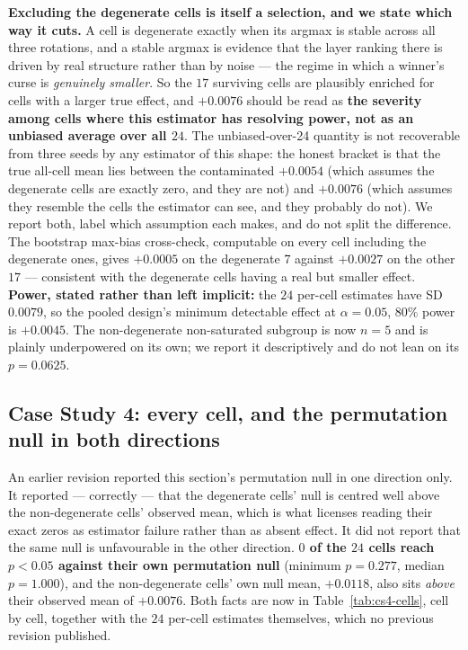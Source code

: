 \documentclass[10pt]{article} %
\begin{document}
\textbf{Excluding the degenerate cells is itself a selection, and we state
which way it cuts.} A cell is degenerate exactly when its argmax is stable
across all three rotations, and a stable argmax is evidence that the layer
ranking there is driven by real structure rather than by noise --- the regime
in which a winner's curse is \emph{genuinely smaller}. So the $17$ surviving
cells are plausibly enriched for cells with a larger true effect, and
$+0.0076$ should be read as \textbf{the severity among cells where this
estimator has resolving power, not as an unbiased average over all $24$}. The
unbiased-over-24 quantity is not recoverable from three seeds by any estimator
of this shape: the honest bracket is that the true all-cell mean lies between
the contaminated $+0.0054$ (which assumes the degenerate cells are exactly
zero, and they are not) and $+0.0076$ (which assumes they resemble the cells
the estimator can see, and they probably do not). We report both, label which
assumption each makes, and do not split the difference. The bootstrap max-bias
cross-check, computable on every cell including the degenerate ones, gives
$+0.0005$ on the degenerate $7$ against $+0.0027$ on the other $17$ ---
consistent with the degenerate cells having a real but smaller effect.
\textbf{Power, stated rather than left implicit:} the $24$ per-cell estimates
have SD $0.0079$, so the pooled design's minimum detectable effect at
$\alpha=0.05$, $80\%$ power is $+0.0045$. The non-degenerate non-saturated
subgroup is now $n=5$ and is plainly underpowered on its own; we report it
descriptively and do not lean on its $p=0.0625$.

\subsection{Case Study 4: every cell, and the permutation null in both directions}
\label{sec:cs4-percell}

An earlier revision reported this section's permutation null in one direction
only. It reported --- correctly --- that the degenerate cells' null is centred
well above the non-degenerate cells' observed mean, which is what licenses
reading their exact zeros as estimator failure rather than as absent effect. It
did not report that the same null is unfavourable in the other direction.
\textbf{$0$ of the $24$ cells reach $p<0.05$ against their own permutation
null} (minimum $p=0.277$, median $p=1.000$), and the non-degenerate cells' own
null mean, $+0.0118$, also sits \emph{above} their observed mean of $+0.0076$.
Both facts are now in Table~\ref{tab:cs4-cells}, cell by cell, together with
the $24$ per-cell estimates themselves, which no previous revision published.
\end{document}
